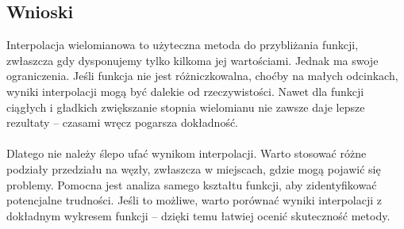 \documentclass{article}
\begin{document}
\subsection{Wnioski}
Interpolacja wielomianowa to użyteczna metoda do przybliżania funkcji, zwłaszcza gdy dysponujemy tylko kilkoma jej wartościami. Jednak ma swoje ograniczenia. Jeśli funkcja nie jest różniczkowalna, choćby na małych odcinkach, wyniki interpolacji mogą być dalekie od rzeczywistości. Nawet dla funkcji ciągłych i gładkich zwiększanie stopnia wielomianu nie zawsze daje lepsze rezultaty – czasami wręcz pogarsza dokładność. 
\\ \\ Dlatego nie należy ślepo ufać wynikom interpolacji. Warto stosować różne podziały przedziału na węzły, zwłaszcza w miejscach, gdzie mogą pojawić się problemy. Pomocna jest analiza samego kształtu funkcji, aby zidentyfikować potencjalne trudności. Jeśli to możliwe, warto porównać wyniki interpolacji z dokładnym wykresem funkcji – dzięki temu łatwiej ocenić skuteczność metody.
\end{document}
